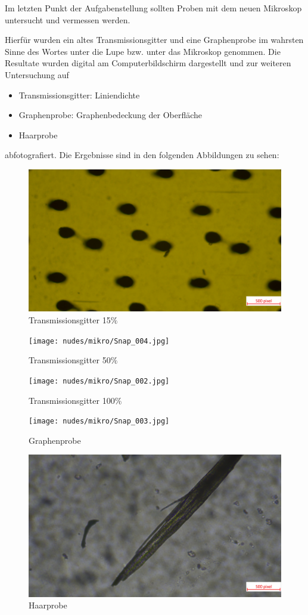 \documentclass[12pt,a4paper,twoside]{article}
\begin{document}
Im letzten Punkt der Aufgabenstellung sollten Proben mit dem neuen Mikroskop untersucht und vermessen werden. \newline

\noindent
Hierfür wurden ein altes Transmissionsgitter und eine Graphenprobe im wahrsten Sinne des Wortes unter die Lupe bzw. unter das Mikroskop genommen.
Die Resultate wurden digital am Computerbildschirm dargestellt und zur weiteren Untersuchung auf

\begin{itemize}
    \item Transmissionsgitter: Liniendichte
    \item Graphenprobe: Graphenbedeckung der Oberfläche
    \item Haarprobe 
\end{itemize}

\noindent
abfotografiert. Die Ergebnisse sind in den folgenden Abbildungen zu sehen:

\begin{figure}[H]
    \centering
    \includegraphics[width=0.5\linewidth, angle=0]{nudes/mikro/Snap_001.jpg}
    \caption{Transmissionsgitter 15$\%$}
    \label{fig:Transmissionsgitter15}
\end{figure}

\begin{figure}[H]
    \centering
    \texttt{[image: nudes/mikro/Snap\_004.jpg]}
    \caption{Transmissionsgitter 50$\%$}
    \label{fig:Transmissionsgitter50}
\end{figure}

\begin{figure}[H]
    \centering
    \texttt{[image: nudes/mikro/Snap\_002.jpg]}
    \caption{Transmissionsgitter 100$\%$}
    \label{fig:Transmissionsgitter100}
\end{figure}

\begin{figure}[H]
    \centering
    \texttt{[image: nudes/mikro/Snap\_003.jpg]}
    \caption{Graphenprobe}
    \label{fig:graphenprobe}
\end{figure}

\begin{figure}[H]
    \centering
    \includegraphics[width=0.5\linewidth, angle=0]{nudes/mikro/Snap_005.jpg}
    \caption{Haarprobe}
    \label{fig:haarprobe}
\end{figure}
\end{document}
